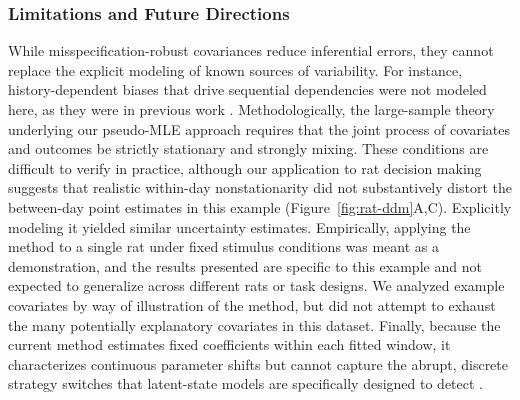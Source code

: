 \documentclass[00-main.tex]{subfiles}
\begin{document}
\subsubsection*{Limitations and Future Directions}
While misspecification-robust covariances reduce inferential errors, they cannot replace the explicit modeling of known sources of variability. For instance, history-dependent biases that drive sequential dependencies were not modeled here, as they were in previous work \citep{nguyen_optimizing_2019, urai_choice_2019, braun_adaptive_2018, gupta_trial-history_2024, miletic_explaining_2025}. Methodologically, the large-sample theory underlying our pseudo-MLE approach requires that the joint process of covariates and outcomes be strictly stationary and strongly mixing. These conditions are difficult to verify in practice, although our application to rat decision making suggests that realistic within-day nonstationarity did not substantively distort the between-day point estimates in this example (Figure~\ref{fig:rat-ddm}A,C). Explicitly modeling it yielded similar uncertainty estimates. Empirically, applying the method to a single rat under fixed stimulus conditions was meant as a demonstration, and the results presented are specific to this example and not expected to generalize across different rats or task designs. We analyzed example covariates by way of illustration of the method, but did not attempt to exhaust the many potentially explanatory covariates in this dataset. Finally, because the current method estimates fixed coefficients within each fitted window, it characterizes continuous parameter shifts but cannot capture the abrupt, discrete strategy switches that latent-state models are specifically designed to detect \citep{ashwood_mice_2022, mohammadi_identifying_2025, kucharsky_hidden_2021, senne_state-dependent_2025}.
\end{document}
